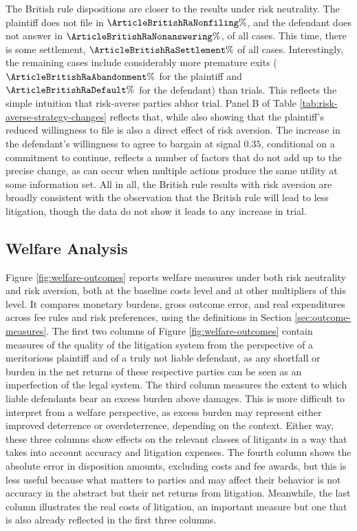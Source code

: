 \documentclass{article}
\begin{document}
The British rule dispositions are closer to the results under risk neutrality. The plaintiff does not file in $\ArticleBritishRaNonfiling\%$, and the defendant does not answer in $\ArticleBritishRaNonanswering\%$, of all cases. This time, there is some settlement, $\ArticleBritishRaSettlement\%$ of all cases. Interestingly, the remaining cases include considerably more premature exits ($\ArticleBritishRaAbandonment\%$ for the plaintiff and $\ArticleBritishRaDefault\%$ for the defendant) than trials. This reflects the simple intuition that risk-averse parties abhor trial. Panel B of Table \ref{tab:risk-averse-strategy-changes} reflects that, while also showing that the plaintiff's reduced willingness to file is also a direct effect of risk aversion. The increase in the defendant's willingness to agree to bargain at signal $0.35$, conditional on a commitment to continue, reflects a number of factors that do not add up to the precise change, as can occur when multiple actions produce the same utility at some information set. All in all, the British rule results with risk aversion are broadly consistent with the observation that the British rule will lead to less litigation, though the data do not show it leads to any increase in trial.

\subsection{Welfare Analysis}
\label{sec:welfare-analysis}

Figure \ref{fig:welfare-outcomes} reports welfare measures under both risk neutrality and risk aversion, both at the baseline costs level and at other multipliers of this level. It compares monetary burdens, gross outcome error, and real expenditures across fee rules and risk preferences, using the definitions in Section \ref{sec:outcome-measures}. The first two columns of Figure \ref{fig:welfare-outcomes} contain measures of the quality of the litigation system from the perspective of a meritorious plaintiff and of a truly not liable defendant, as any shortfall or burden in the net returns of these respective parties can be seen as an imperfection of the legal system. The third column measures the extent to which liable defendants bear an excess burden above damages. This is more difficult to interpret from a welfare perspective, as excess burden may represent either improved deterrence or overdeterrence, depending on the context. Either way, these three columns show effects on the relevant classes of litigants in a way that takes into account accuracy and litigation expenses. The fourth column shows the absolute error in disposition amounts, excluding costs and fee awards, but this is less useful because what matters to parties and may affect their behavior is not accuracy in the abstract but their net returns from litigation. Meanwhile, the last column illustrates the real costs of litigation, an important measure but one that is also already reflected in the first three columns.
\end{document}

